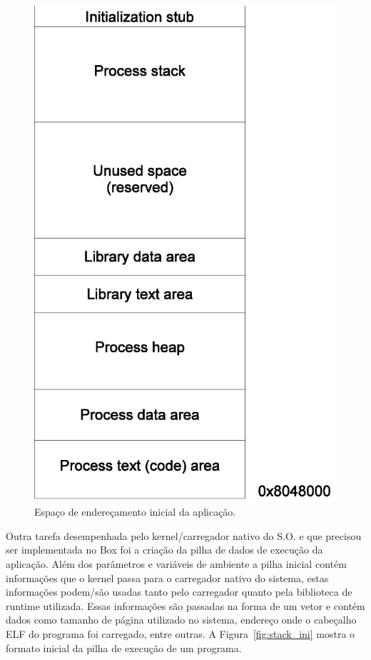 \documentclass[11pt,twoside]{article}
\begin{document}
\begin{figure}[!h]
        \begin{center}
        \includegraphics[scale=0.5]{figures/esp_end.eps}
        \end{center}
        \caption{Espaço de endereçamento inicial da aplicação.}
        \label{fig:esp_end}
\end{figure}

Outra tarefa desempenhada pelo kernel/carregador nativo do S.O. e que precisou ser
implementada no Box foi a criação da pilha de dados de execução da
aplicação. Além dos parâmetros e variáveis de ambiente a pilha inicial contém
informações que o kernel passa para o carregador nativo do sistema, estas
informações podem/são usadas tanto pelo carregador quanto pela biblioteca de
runtime utilizada. Essas informações são passadas na forma de um vetor e contém
dados como tamanho de página utilizado no sistema, endereço onde o
cabeçalho ELF do programa foi carregado, entre outras. A
Figura~\ref{fig:stack_ini} mostra o formato inicial da pilha de execução de um
programa.
\end{document}
